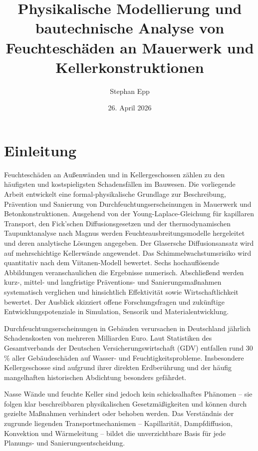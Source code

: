 ﻿\documentclass[a4paper,12pt]{article}
\title{\bfseries Physikalische Modellierung und bautechnische Analyse von Feuchtesch\"aden an Mauerwerk und Kellerkonstruktionen}
\author{Stephan Epp}
\date{26. April 2026}
\theoremstyle{definition}
\begin{document}

\maketitle
\tableofcontents
\newpage

\section{Einleitung}
Feuchtesch\"aden an Au\ss{}enw\"anden und in Kellergeschossen z\"ahlen zu den
h\"aufigsten und kostspieligsten Schadensf\"allen im Bauwesen. Die vorliegende
Arbeit entwickelt eine formal-physikalische Grundlage zur Beschreibung,
Pr\"avention und Sanierung von Durchfeuchtungserscheinungen in Mauerwerk und
Betonkonstruktionen. Ausgehend von der Young-Laplace-Gleichung f\"ur
kapillaren Transport, den Fick'schen Diffusionsgesetzen und der thermody\-namischen
Taupunktanalyse nach Magnus werden Feuchteausbreitungsmodelle hergeleitet
und deren analytische L\"osungen angegeben. Der Glasersche Diffusionsansatz
wird auf mehrschichtige Kellerw\"ande angewendet. Das Schimmelwachstumsrisiko
wird quantitativ nach dem Viitanen-Modell bewertet. Sechs hochaufl\"osende
Abbildungen veranschaulichen die Ergebnisse numerisch. Abschlie\ss{}end werden
kurz-, mittel- und langfristige Pr\"aventions- und Sanierungsma\ss{}nahmen
systematisch verglichen und hinsichtlich Effektivit\"at sowie Wirtschaftlichkeit
bewertet. Der Ausblick skizziert offene Forschungsfragen und zuk\"unftige
Entwicklungspotenziale in Simulation, Sensorik und Materialentwicklung.

Durchfeuchtungserscheinungen in Geb\"auden verursachen in Deutschland j\"ahrlich
Schadenskosten von mehreren Milliarden Euro. Laut Statistiken des Gesamtverbands
der Deutschen Versicherungswirtschaft (GDV) entfallen rund 30\,\% aller
Geb\"audesch\"aden auf Wasser- und Feuchtigkeitsprobleme. Insbesondere Kellergeschosse
sind aufgrund ihrer direkten Erdber\"uhrung und der h\"aufig mangelhaften historischen
Abdichtung besonders gef\"ahrdet.

Nasse W\"ande und feuchte Keller sind jedoch kein schicksalhaftes Ph\"anomen --
sie folgen klar beschreibbaren physikalischen Gesetzm\"a\ss{}igkeiten und k\"onnen
durch gezielte Ma\ss{}nahmen verhindert oder behoben werden. Das
Verst\"andnis der zugrunde liegenden Transportmechanismen -- Kapillarit\"at,
Dampfdiffusion, Konvektion und W\"armeleitung -- bildet die unverzichtbare
Basis f\"ur jede Planungs- und Sanierungsentscheidung.
\end{document}
